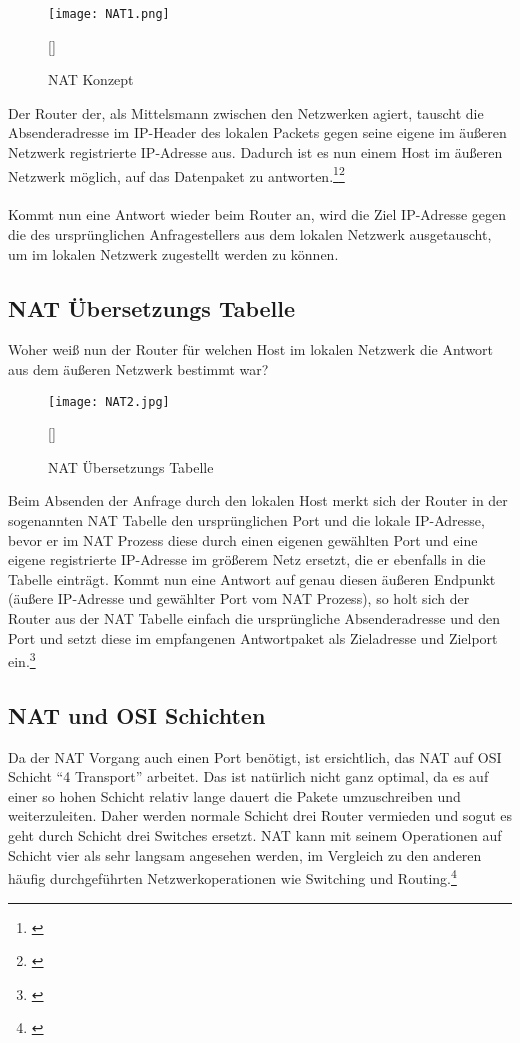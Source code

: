 \newpage
\begin{figure}[h]
    \centering
    \texttt{[image: NAT1.png]}
    \caption[NAT Konzept]{NAT Konzept}[\cite{NATi1}]
\end{figure}
\noindent
Der Router der, als Mittelsmann zwischen den Netzwerken agiert, tauscht die Absenderadresse im IP-Header des lokalen Packets gegen seine eigene im äußeren Netzwerk registrierte IP-Adresse aus. Dadurch ist es nun einem Host im äußeren Netzwerk möglich, auf das Datenpaket zu antworten.\footnote[1]{\cite[Vgl.][]{NAT1}}\footnote[2]{\cite[Vgl.][]{NAT3}} 
\\\\
Kommt nun eine Antwort wieder beim Router an, wird die Ziel IP-Adresse gegen die des ursprünglichen Anfragestellers aus dem lokalen Netzwerk ausgetauscht, um im lokalen Netzwerk zugestellt werden zu können.

\newpage
\subsection{NAT Übersetzungs Tabelle}
Woher weiß nun der Router für welchen Host im lokalen Netzwerk die Antwort aus dem äußeren Netzwerk bestimmt war? 
\begin{figure}[h]
    \centering
    \texttt{[image: NAT2.jpg]}
    \caption[NAT Übersetzungs Tabelle]{NAT Übersetzungs Tabelle}[\cite{NATi2}]
\end{figure}
Beim Absenden der Anfrage durch den lokalen Host merkt sich der Router in der sogenannten NAT Tabelle den ursprünglichen Port und die lokale IP-Adresse, bevor er im NAT Prozess diese durch einen eigenen gewählten Port und eine eigene registrierte IP-Adresse im größerem Netz ersetzt, die er ebenfalls in die Tabelle einträgt. 
Kommt nun eine Antwort auf genau diesen äußeren Endpunkt (äußere IP-Adresse und gewählter Port vom NAT Prozess), so holt sich der Router aus der NAT Tabelle einfach die ursprüngliche Absenderadresse und den Port und setzt diese im empfangenen Antwortpaket als Zieladresse und Zielport ein.\footnote[1]{\cite[Vgl.][]{NAT5}}
\subsection{NAT und OSI Schichten}
Da der NAT Vorgang auch einen Port benötigt, ist ersichtlich, das NAT auf OSI Schicht “4 Transport” arbeitet. Das ist natürlich nicht ganz optimal, da es auf einer so hohen Schicht relativ lange dauert die Pakete umzuschreiben und weiterzuleiten. Daher werden normale Schicht drei Router vermieden und sogut es geht durch Schicht drei Switches ersetzt. NAT kann mit seinem Operationen auf Schicht vier als sehr langsam angesehen werden, im Vergleich zu den anderen häufig durchgeführten Netzwerkoperationen wie Switching und Routing.\footnote[2]{\cite[Vgl.][]{NAT6}}

